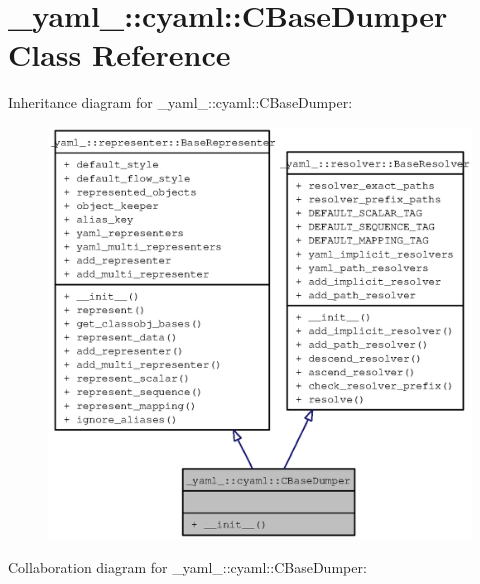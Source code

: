 \section{\_\-yaml\_\-::cyaml::CBaseDumper Class Reference}
\label{class__yaml___1_1cyaml_1_1CBaseDumper}
Inheritance diagram for \_\-yaml\_\-::cyaml::CBaseDumper:\nopagebreak
\begin{figure}[H]
\begin{center}
\leavevmode
\includegraphics[width=400pt]{class__yaml___1_1cyaml_1_1CBaseDumper__inherit__graph}
\end{center}
\end{figure}
Collaboration diagram for \_\-yaml\_\-::cyaml::CBaseDumper:\nopagebreak
